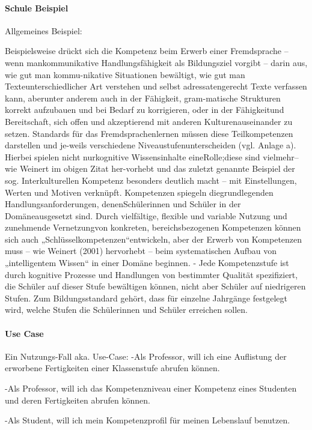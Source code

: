 \documentclass[
12pt,
english,
ngerman,
headsepline,
twoside,
openright,
numbers=noenddot,version=first
]{scrreprt}
\begin{document}
\paragraph{Schule Beispiel}
Allgemeines Beispiel:

Beispielsweise drückt sich die Kompetenz beim Erwerb einer Fremdsprache – wenn mankommunikative Handlungsfähigkeit als Bildungsziel vorgibt – darin aus, wie gut man kommu-nikative Situationen bewältigt, wie gut man Texteunterschiedlicher Art verstehen und selbst adressatengerecht Texte verfassen kann, aberunter anderem auch in der Fähigkeit, gram-matische Strukturen korrekt aufzubauen und bei Bedarf zu korrigieren, oder in der Fähigkeitund Bereitschaft, sich offen und akzeptierend mit anderen Kulturenauseinander zu setzen. Standards für das Fremdsprachenlernen müssen diese Teilkompetenzen darstellen und je-weils verschiedene Niveaustufenunterscheiden (vgl. Anlage a). Hierbei spielen nicht nurkognitive Wissensinhalte eineRolle;diese sind vielmehr– wie Weinert im obigen Zitat her-vorhebt und das zuletzt genannte Beispiel der sog. Interkulturellen Kompetenz besonders deutlich macht – mit Einstellungen, Werten und Motiven verknüpft.
Kompetenzen spiegeln diegrundlegenden Handlungsanforderungen, denenSchülerinnen und Schüler in der Domäneausgesetzt sind. Durch vielfältige, flexible und variable Nutzung und zunehmende Vernetzungvon konkreten, bereichsbezogenen Kompetenzen können sich auch „Schlüsselkompetenzen“entwickeln, aber der Erwerb von Kompetenzen muss – wie Weinert (2001) hervorhebt – beim systematischen Aufbau von „intelligentem Wissen“ in einer Domäne beginnen.
- Jede Kompetenzstufe ist durch kognitive Prozesse und Handlungen von bestimmter Qualität spezifiziert, die Schüler auf dieser Stufe bewältigen können, nicht aber Schüler auf niedrigeren Stufen. Zum Bildungsstandard gehört, dass für einzelne Jahrgänge festgelegt wird, welche Stufen die Schülerinnen und Schüler erreichen sollen.

\paragraph{Use Case}
Ein Nutzungs-Fall aka. Use-Case:
-Als Professor, will ich eine Auflistung der erworbene Fertigkeiten einer Klassenstufe abrufen können.

-Als Professor, will ich das Kompetenzniveau einer Kompetenz eines Studenten und deren Fertigkeiten abrufen können.

-Als Student, will ich mein Kompetenzprofil für meinen Lebenslauf benutzen.
\end{document}
